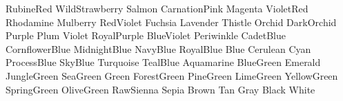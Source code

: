 \newColor RubineRed	  %
\newColor WildStrawberry  %
\newColor Salmon	  %
\newColor CarnationPink	  %
\newColor Magenta	  %
\newColor VioletRed	  %
\newColor Rhodamine	  %
\newColor Mulberry	  %
\newColor RedViolet	  %
\newColor Fuchsia	  %
\newColor Lavender	  %
\newColor Thistle	  %
\newColor Orchid	  %
\newColor DarkOrchid	  %
\newColor Purple	  %
\newColor Plum		  %
\newColor Violet	  %
\newColor RoyalPurple	  %
\newColor BlueViolet	  %
\newColor Periwinkle	  %
\newColor CadetBlue	  %
\newColor CornflowerBlue  %
\newColor MidnightBlue	  %
\newColor NavyBlue	  %
\newColor RoyalBlue	  %
\newColor Blue		  %
\newColor Cerulean	  %
\newColor Cyan		  %
\newColor ProcessBlue	  %
\newColor SkyBlue	  %
\newColor Turquoise	  %
\newColor TealBlue	  %
\newColor Aquamarine	  %
\newColor BlueGreen	  %
\newColor Emerald	  %
\newColor JungleGreen	  %
\newColor SeaGreen	  %
\newColor Green		  %
\newColor ForestGreen	  %
\newColor PineGreen	  %
\newColor LimeGreen	  %
\newColor YellowGreen	  %
\newColor SpringGreen	  %
\newColor OliveGreen	  %
\newColor RawSienna	  %
\newColor Sepia		  %
\newColor Brown		  %
\newColor Tan		  %
\newColor Gray		  %
\newColor Black		  %
\newColor White		  %

